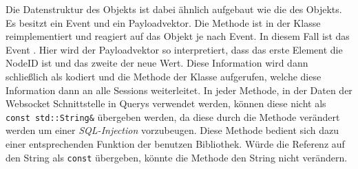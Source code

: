 Die Datenstruktur des  Objekts ist dabei ähnlich aufgebaut wie die des  Objekts.
Es besitzt ein Event und ein Payloadvektor.
Die Methode  ist in der Klasse  reimplementiert und reagiert auf das  Objekt je nach Event.
In diesem Fall ist das Event . Hier wird der Payloadvektor so interpretiert, dass das erste Element die NodeID ist und das zweite der neue Wert.
Diese Information wird dann schließlich als  kodiert und die Methode  der  Klasse aufgerufen, 
welche diese Information dann an alle Sessions weiterleitet.
In jeder Methode, in der Daten der Websocket Schnittstelle in Querys verwendet werden, können diese nicht als \texttt{const std::String&} übergeben werden, da diese durch die Methode  verändert werden um einer \emph{SQL-Injection} vorzubeugen.
Diese Methode bedient sich dazu einer entsprechenden Funktion der benutzen Bibliothek.
Würde die Referenz auf den String als \texttt{const} übergeben, könnte die Methode den String nicht verändern.



